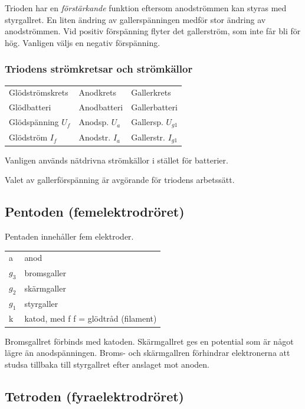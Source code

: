 Trioden har en \emph{förstärkande} funktion eftersom anodströmmen kan styras med
styrgallret. En liten ändring av gallerspänningen medför stor ändring av
anodströmmen. Vid positiv förspänning flyter det gallerström, som inte får bli
för hög. Vanligen väljs en negativ förspänning.

\subsubsection{Triodens strömkretsar och strömkällor}

\begin{tabular}{lll}
Glödströmskrets      & Anodkrets        &  Gallerkrets \\
Glödbatteri          & Anodbatteri      &  Gallerbatteri \\
Glödspänning \(U_f\) & Anodsp. \(U_a\)  &  Gallersp. \(U_{g1}\) \\
Glödström \(I_f\)    & Anodstr. \(I_a\) &  Gallerstr. \(I_{g1}\) \\
\end{tabular}

Vanligen används nätdrivna strömkällor i stället för batterier.

Valet av gallerförspänning är avgörande för triodens arbetssätt.

\subsection{Pentoden (femelektrodröret)}

Pentaden innehåller fem elektroder.
\begin{tabular}{ll}
  a       & anod \\
  \(g_3\) & bromsgaller \\
  \(g_2\) & skärmgaller \\
  \(g_1\) & styrgaller \\
  k      & katod, med f f = glödtråd (filament) \\
\end{tabular}

Bromsgallret förbinds med katoden. Skärmgallret ges en potential som är något
lägre än anodspänningen. Broms- och skärmgallren förhindrar elektronerna att
studsa tillbaka till styrgallret efter anslaget mot anoden.


\subsection{Tetroden (fyraelektrodröret)}

